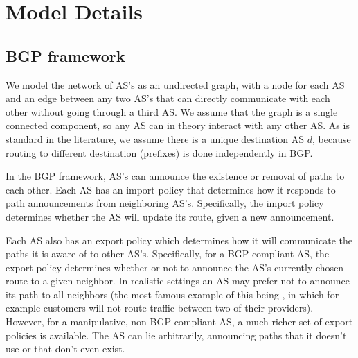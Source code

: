\documentclass[10pt]{article}
\begin{document}

\section{Model Details}
  \subsection{BGP framework}
    We model the network of AS's as an undirected graph, with a node for each AS
    and an edge between any two AS's that can directly communicate with each other
    without going through a third AS. We assume that the graph is a single
    connected component, so any AS can in theory interact with any other AS.
    As is standard in the literature, we assume there is a unique destination AS
    $d$, because routing to different destination (prefixes) is done
    independently in BGP.

    In the BGP framework, AS's can announce the
    existence or removal of paths to each other.
    Each AS has an import policy that
    determines how it responds to path announcements from neighboring AS's.
    Specifically, the import policy determines whether the AS will update
    its route, given a new announcement.

    Each AS also has an export policy which determines how it will communicate the
    paths it is aware of to other AS's.
    Specifically, for a BGP compliant AS, the export policy determines
    whether or not to announce the AS's currently chosen route to a given neighbor.
    In realistic settings an AS may prefer not to announce its path to all neighbors
    (the most famous example of this being \cite{GaoRexford},
    in which for example customers will not route traffic
    between two of their providers).
    However, for a manipulative, non-BGP compliant AS,
    a much richer set of export policies is available.
    The AS can lie arbitrarily, announcing paths that it doesn't use
    or that don't even exist.
\end{document}
